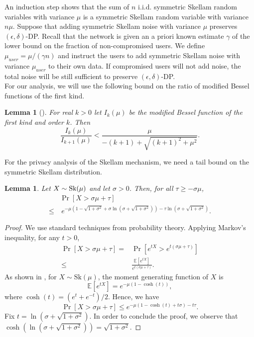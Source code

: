 \documentclass[10pt]{extarticle}
\newcommand{\E}{\mathbb{E}}
\newtheorem{Lem}[Thm]{Lemma}
\begin{document}
An induction step shows that the sum of $n$ i.i.d. symmetric Skellam random variables with variance $\mu$ is a symmetric Skellam random variable with variance $n\mu$. Suppose that adding symmetric Skellam noise with variance $\mu$ preserves $(\epsilon,\delta)$-\mbox{\upshape\sffamily DP}. Recall that the network is given an a priori known estimate $\gamma$ of the lower bound on the fraction of non-compromised users. We define $\mu_{user}=\mu/(\gamma n)$ and instruct the users to add symmetric Skellam noise with variance $\mu_{user}$ to their own data. If compromised users will not add noise, the total noise will be still sufficient to preserve $(\epsilon,\delta)$-\mbox{\upshape\sffamily DP}.\\ 
For our analysis, we will use the following bound on the ratio of modified Bessel functions of the first kind.


\begin{Lem}[\cite{27}]\label{modbesrat} For real $k>0$ let $I_k(\mu)$ be the modified Bessel function of the first kind and order $k$. Then
 \[\frac{I_k(\mu)}{I_{k+1}(\mu)}<\frac{\mu}{-(k+1)+\sqrt{(k+1)^2+\mu^2}}.\]
\end{Lem}

For the privacy analysis of the Skellam mechanism, we need a tail bound on the symmetric Skellam distribution.

\begin{Lem}\label{SKELLAMBOUND} Let $X\sim \text{\upshape Sk}(\mu)$ and let $\sigma>0$. Then, for all $\tau\geq -\sigma\mu$, 
\begin{align*}
  & \Pr[X>\sigma\mu + \tau] \\
  \leq & \ e^{-\mu\left(1-\sqrt{1+\sigma^2}+\sigma\ln(\sigma + \sqrt{1+\sigma^2})\right)-\tau\ln(\sigma + \sqrt{1+\sigma^2})}.   
\end{align*}
\end{Lem}
\begin{proof}
We use standard techniques from probability theory. Applying Markov's inequality, for any $t>0$,
\begin{align*}\Pr[X>\sigma\mu + \tau]= & \Pr[e^{tX}>e^{t(\sigma\mu + \tau)}]\\
\leq & \frac{\E[e^{tX}]}{e^{t(\sigma\mu + \tau)}}.
\end{align*}
As shown in \cite{30}, for $X\sim \text{Sk}(\mu)$, the moment generating function of $X$ is 
\[\E[e^{tX}]=e^{-\mu(1-\cosh(t))},\]
where $\cosh(t)= (e^t + e^{-t})/2$. Hence, we have
\[\Pr[X>\sigma\mu + \tau]\leq e^{-\mu(1-\cosh(t)+t\sigma)-t\tau}.\]
Fix $t=\ln(\sigma + \sqrt{1+\sigma^2})$. In order to conclude the proof, we observe that $\cosh(\ln(\sigma + \sqrt{1+\sigma^2}))=\sqrt{1+\sigma^2}$.
\end{proof}
\end{document}
